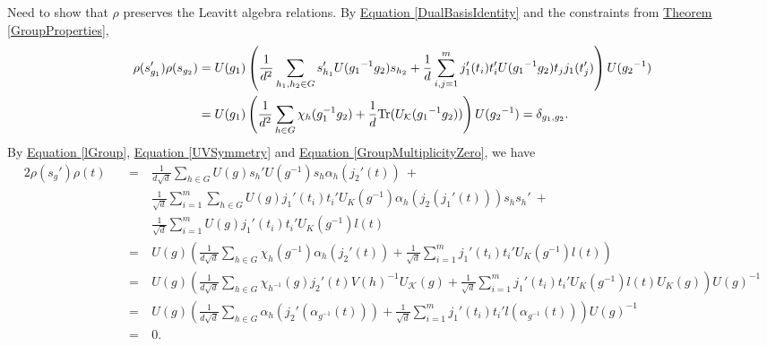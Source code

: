 \noindent Need to show that $\rho$ preserves the Leavitt algebra relations. By \hyperref[DualBasisIdentity]{Equation \eqref*{DualBasisIdentity}} and the constraints from \hyperref[GroupProperties]{Theorem \ref*{GroupProperties}},
\begin{align*}
\rho(s_{g_1}')\rho(s_{g_2}) &= U({g_1})\left(\frac{1}{d^2}\sum_{h_1,h_2 \in G}s_{h_1}'U({g_1}^{-1}{g_2})s_{h_2} + \frac{1}{d}\sum_{i,j=1}^m j_1'(t_i)t_i'U({g_1}^{-1}{g_2})t_j j_1(t_j')\right)U({g_2}^{-1})\\
&= U({g_1})\left(\frac{1}{d^2}\sum_{h \in G}\chi_h(g_1^{-1}g_2) + \frac{1}{d}\textup{Tr}(U_\mathcal{K}({g_1}^{-1}{g_2}))\right)U({g_2}^{-1}) = \delta_{g_1,g_2}.
\end{align*}
\noindent By \hyperref[lGroup]{Equation \eqref*{lGroup}}, \hyperref[UVSymmetry]{Equation \eqref*{UVSymmetry}} and \hyperref[GroupMultiplicityZero]{Equation \eqref*{GroupMultiplicityZero}}, we have
\begin{alignat*}{2}
\rho(s_g')\rho(t)\ &&=\ &\frac{1}{d\sqrt{d}}\sum_{h \in G}U(g) s_h'U(g^{-1})s_h\alpha_h(j_2'(t))\ +\\
&&&\frac{1}{\sqrt{d}}\sum_{i=1}^m\sum_{h \in G} U(g)j_1'(t_i)t_i'U_K(g^{-1})\alpha_h(j_2(j_1'(t)))s_hs_h'\ +\\
&&&\frac{1}{\sqrt{d}}\sum_{i=1}^m U(g)j_1'(t_i)t_i'U_K(g^{-1})l(t)\\
&&=\ &U(g)\left(\frac{1}{d\sqrt{d}}\sum_{h \in G}\chi_h(g^{-1})\alpha_h(j_2'(t)) + \frac{1}{\sqrt{d}}\sum_{i=1}^m j_1'(t_i)t_i'U_K(g^{-1})l(t)\right)\\
&&=\ &U(g)\left(\frac{1}{d\sqrt{d}}\sum_{h \in G}\chi_{h^{-1}}(g)j_2'(t)V(h)^{-1}U_\mathcal{K}(g) + \frac{1}{\sqrt{d}}\sum_{i=1}^m j_1'(t_i)t_i'U_K(g^{-1})l(t)U_K(g)\right)U(g)^{-1}\\
&&=\ &U(g)\left(\frac{1}{d\sqrt{d}}\sum_{h \in G}\alpha_h(j_2'(\alpha_{g^{-1}}(t))) + \frac{1}{\sqrt{d}}\sum_{i=1}^m j_1'(t_i)t_i'l(\alpha_{g^{-1}}(t))\right)U(g)^{-1}\\
&&=\ &0.
\end{alignat*}
